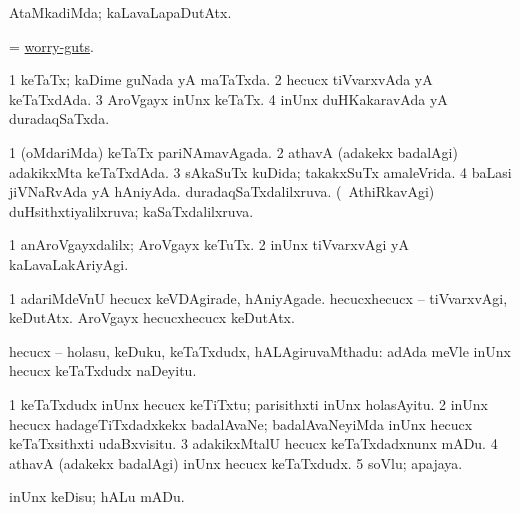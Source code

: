 \begin{center}
\bentry
{} 
\gl{\kirxvi}
\expl{}
\bmng
AtaMkadiMda; kaLavaLapaDutAtx. 
\emng
\eentry

\bentry
{} 
\gl{\nA}
\expl{}
\bmng
= \hyperlink{worry-guts}{worry-guts}. 
\emng
\eentry

\bentry
{} 
\gl{\gu}
\expl{}
\bmng
\bnum
\num{1} keTaTx; kaDime guNada yA maTaTxda. 
\num{2} hecucx tiVvarxvAda yA keTaTxdAda. 
\num{3} AroVgayx inUnx keTaTx. 
\num{4} inUnx duHKakaravAda yA duradaqSaTxda. 
\enum
\emng

\noindent
\gl{\pagu}
\expl{}
\bmng
\bnum
\num{1}  (oMdariMda) keTaTx pariNAmavAgada. 
\num{2}  athavA (adakekx badalAgi) adakikxMta keTaTxdAda. 
\num{3}  sAkaSuTx kuDida; takakxSuTx amaleVrida. 
\num{4}  baLasi jiVNaRvAda yA hAniyAda. 
  
\banum
{} duradaqSaTxdalilxruva. 
 (\kanmu\ AthiRkavAgi) duHsithxtiyalilxruva; kaSaTxdalilxruva. 
\eanum
\numie
\enum
\emng
\eentry

\bentry
{} 
\gl{\kirxvi}
\expl{}
\bmng
\bnum
\num{1} anAroVgayxdalilx; AroVgayx keTuTx. 
\num{2} inUnx tiVvarxvAgi yA kaLavaLakAriyAgi. 
\enum
\emng

\noindent
\gl{\pagu}
\expl{}
\bmng
\bnum
\num{1}  adariMdeVnU hecucx keVDAgirade, hAniyAgade. 
  
\banum
{} hecucxhecucx -- tiVvarxvAgi, keDutAtx. 
 AroVgayx hecucxhecucx keDutAtx. 
\eanum
\numie
\enum
\emng
\eentry

\bentry
{} 
\gl{\nA}
\expl{}
\bmng
hecucx -- holasu, keDuku, keTaTxdudx, hALAgiruvaMthadu:  adAda meVle inUnx hecucx keTaTxdudx naDeyitu. 
\emng

\noindent
\gl{\pagu}
\expl{}
\bmng
\bnum
\num{1}  keTaTxdudx inUnx hecucx keTiTxtu; parisithxti inUnx holasAyitu. 
\num{2}  inUnx hecucx hadageTiTxdadxkekx badalAvaNe; badalAvaNeyiMda inUnx hecucx keTaTxsithxti udaBxvisitu. 
\num{3}  adakikxMtalU hecucx keTaTxdadxnunx mADu. 
\num{4}  athavA (adakekx badalAgi) inUnx hecucx keTaTxdudx. 
\num{5}  soVlu; apajaya. 
\enum
\emng
\eentry

\bentry
{} 
\gl{\sakirx}
\expl{}
\bmng
inUnx keDisu; hALu mADu. 
\emng


\end{center}
